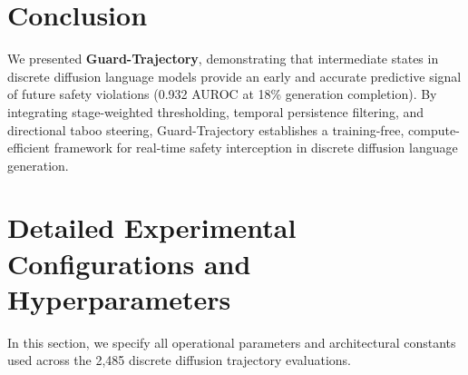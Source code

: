 \documentclass[conference]{IEEEtran}
\begin{document}
\section{Conclusion}
We presented \textbf{Guard-Trajectory}, demonstrating that intermediate states in discrete diffusion language models provide an early and accurate predictive signal of future safety violations (0.932 AUROC at 18\% generation completion). By integrating stage-weighted thresholding, temporal persistence filtering, and directional taboo steering, Guard-Trajectory establishes a training-free, compute-efficient framework for real-time safety interception in discrete diffusion language generation.



\appendix
\section{Detailed Experimental Configurations and Hyperparameters}
\label{app:hyperparams}

In this section, we specify all operational parameters and architectural constants used across the 2,485 discrete diffusion trajectory evaluations.
\end{document}
